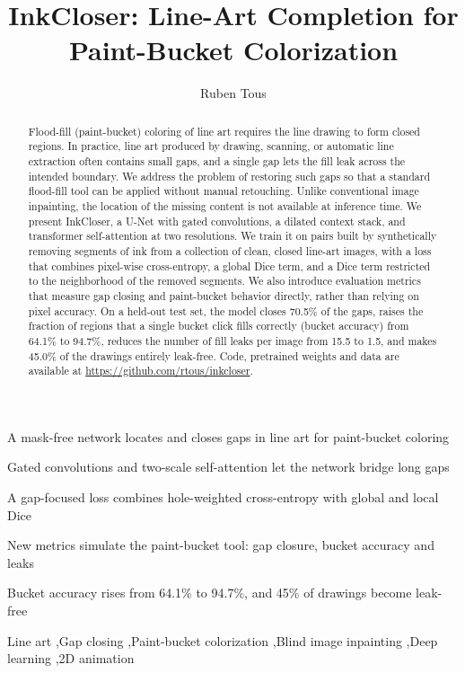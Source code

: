 \documentclass[preprint,12pt]{elsarticle}
\begin{document}
\begin{frontmatter}

\title{InkCloser: Line-Art Completion for Paint-Bucket Colorization}

\author{Ruben Tous}


\begin{abstract}
Flood-fill (paint-bucket) coloring of line art requires the line drawing to form closed
regions. In practice, line art produced by drawing, scanning, or automatic line extraction
often contains small gaps, and a single gap lets the fill leak across the intended
boundary. We address the problem of restoring such gaps so that a
standard flood-fill tool can be applied without manual retouching. Unlike conventional
image inpainting, the location of the missing content is not available at inference
time. We present InkCloser, a U-Net with gated convolutions, a dilated
context stack, and transformer self-attention at two resolutions. We train it on pairs
built by synthetically removing segments of ink from a collection of clean, closed line-art
images, with a loss that combines pixel-wise cross-entropy, a global Dice term, and
a Dice term restricted to the neighborhood of the removed segments.
We also introduce evaluation metrics that measure gap closing and paint-bucket
behavior directly, rather than relying on pixel accuracy. On a held-out test set, the model closes 70.5\% of the gaps, raises the fraction of
regions that a single bucket click fills correctly (bucket accuracy) from 64.1\% to 94.7\%, reduces
the number of fill leaks per image from 15.5 to 1.5, and makes 45.0\% of the drawings
entirely leak-free. Code, pretrained weights and data are available at \url{https://github.com/rtous/inkcloser}.
\end{abstract}

\begin{highlights}
\item A mask-free network locates and closes gaps in line art for paint-bucket coloring
\item Gated convolutions and two-scale self-attention let the network bridge long gaps
\item A gap-focused loss combines hole-weighted cross-entropy with global and local Dice
\item New metrics simulate the paint-bucket tool: gap closure, bucket accuracy and leaks
\item Bucket accuracy rises from 64.1\% to 94.7\%, and 45\% of drawings become leak-free
\end{highlights}

\begin{keyword}
Line art \sep Gap closing \sep Paint-bucket colorization \sep Blind image inpainting \sep Deep learning \sep 2D animation
\end{keyword}

\end{frontmatter}
\end{document}
